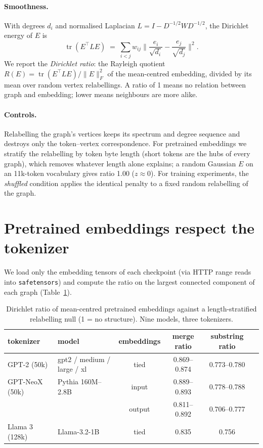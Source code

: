 \documentclass[11pt]{article}
\begin{document}
\paragraph{Smoothness.} With degrees $d_i$ and normalised Laplacian
$L=I-D^{-1/2}WD^{-1/2}$, the Dirichlet energy of $E$ is
\begin{equation}
  \operatorname{tr}(E^\top L E) \;=\; \sum_{i<j} w_{ij}
  \Big\lVert \frac{e_i}{\sqrt{d_i}}-\frac{e_j}{\sqrt{d_j}} \Big\rVert^2 .
\end{equation}
We report the \emph{Dirichlet ratio}: the Rayleigh quotient
$R(E)=\operatorname{tr}(E^\top LE)/\lVert E\rVert_F^2$ of the mean-centred embedding,
divided by its mean over random vertex relabellings. A ratio of 1 means no
relation between graph and embedding; lower means neighbours are more alike.

\paragraph{Controls.} Relabelling the graph's vertices keeps its spectrum and degree
sequence and destroys only the token--vertex correspondence. For pretrained
embeddings we stratify the relabelling by token byte length (short tokens are the
hubs of every graph), which removes whatever length alone explains; a random
Gaussian $E$ on an 11k-token vocabulary gives ratio 1.00 ($z\approx0$). For training
experiments, the \emph{shuffled} condition applies the identical penalty to a fixed
random relabelling of the graph.

\section{Pretrained embeddings respect the tokenizer}\label{sec:pretrained}

We load only the embedding tensors of each checkpoint (via HTTP range reads into
\texttt{safetensors}) and compute the ratio on the largest connected component of
each graph (Table~\ref{tab:pretrained}).

\begin{table}[t]
\centering
\small
\begin{tabular}{llcccc}
\toprule
tokenizer & model & embeddings & merge ratio & substring ratio \\
\midrule
GPT-2 (50k)  & gpt2 / medium / large / xl & tied & 0.869--0.874 & 0.773--0.780 \\
GPT-NeoX (50k) & Pythia 160M--2.8B & input  & 0.889--0.893 & 0.778--0.788 \\
             &                   & output & 0.811--0.892 & 0.706--0.777 \\
Llama 3 (128k) & Llama-3.2-1B & tied & 0.835 & 0.756 \\
\bottomrule
\end{tabular}
\caption{Dirichlet ratio of mean-centred pretrained embeddings against a
length-stratified relabelling null (1 = no structure). Nine models, three
tokenizers.}
\label{tab:pretrained}
\end{table}
\end{document}
